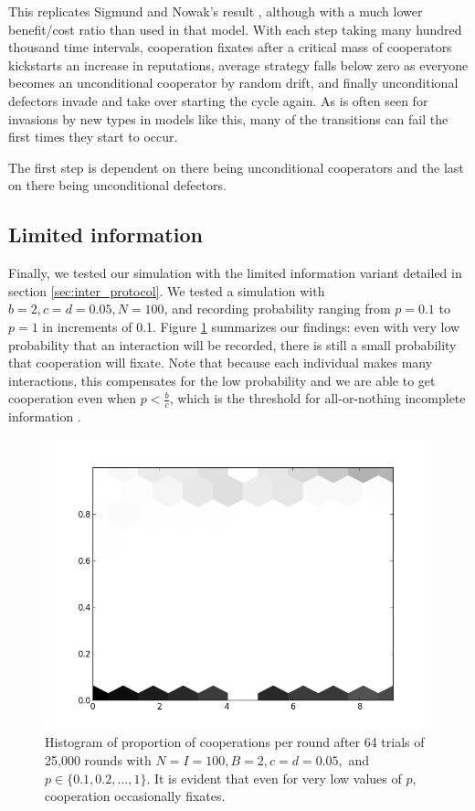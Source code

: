 \documentclass{amsart}
\newcommand{\f}[2]{\frac{#1}{#2}}
\begin{document}
This replicates Sigmund and Nowak's result
\cite{nowak_evolution_1998}, although with a much lower benefit/cost
ratio than used in that model. With each step taking many hundred
thousand time intervals, cooperation fixates after a critical mass of
cooperators kickstarts an increase in reputations, average strategy
falls below zero as everyone becomes an unconditional cooperator by
random drift, and finally unconditional defectors invade and take over
starting the cycle again. As is often seen for invasions by new types
in models like this, many of the transitions can fail the first times
they start to occur.

The first step is dependent on there being unconditional cooperators
and the last on there being unconditional defectors.

\subsection{Limited information}

Finally, we tested our simulation with the limited information variant
detailed in section \ref{sec:inter_protocol}. We tested a simulation
with $b=2, c=d=0.05, N=100$, and recording probability ranging from
$p=0.1$ to $p=1$ in increments of 0.1. Figure \ref{fig:gos} summarizes
our findings: even with very low probability that an interaction will
be recorded, there is still a small probability that cooperation will
fixate. Note that because each individual makes many interactions,
this compensates for the low probability and we are able to get
cooperation even when $p < \f{b}{c}$, which is the threshold for
all-or-nothing incomplete information \cite{nowak_five_2006}.

\begin{figure}[h!tbp]
\includegraphics[width=.5\textwidth]{GOS.png}
\caption{Histogram of proportion of cooperations per round after 64
  trials of 25,000 rounds with $N=I=100, B=2,c=d=0.05,$ and $p \in
  \{0.1,0.2,\dots,1\}$. It is evident that even for very low values of
  $p$, cooperation occasionally fixates.}
\label{fig:gos}
\end{figure}
\end{document}
